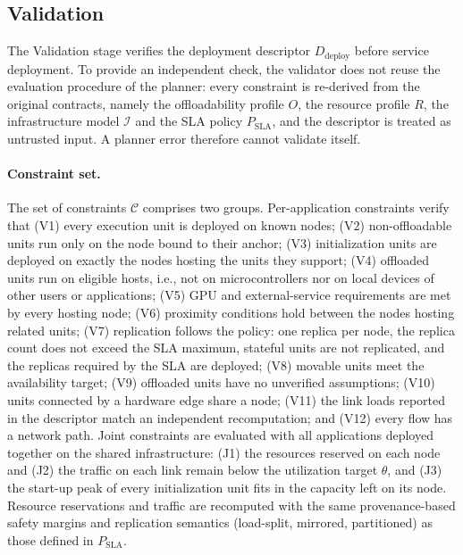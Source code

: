 \subsection{Validation}

The Validation stage verifies the deployment descriptor $D_{\mathrm{deploy}}$
before service deployment. To provide an independent check, the validator does
not reuse the evaluation procedure of the planner: every constraint is
re-derived from the original contracts, namely the offloadability profile $O$,
the resource profile $R$, the infrastructure model $\mathcal{I}$ and the SLA
policy $P_{\mathrm{SLA}}$, and the descriptor is treated as untrusted input.
A planner error therefore cannot validate itself.

\paragraph{Constraint set.}
The set of constraints $\mathcal{C}$ comprises two groups. Per-application
constraints verify that
(V1) every execution unit is deployed on known nodes;
(V2) non-offloadable units run only on the node bound to their anchor;
(V3) initialization units are deployed on exactly the nodes hosting the units
they support;
(V4) offloaded units run on eligible hosts, i.e., not on microcontrollers nor
on local devices of other users or applications;
(V5) GPU and external-service requirements are met by every hosting node;
(V6) proximity conditions hold between the nodes hosting related units;
(V7) replication follows the policy: one replica per node, the replica count
does not exceed the SLA maximum, stateful units are not replicated, and the
replicas required by the SLA are deployed;
(V8) movable units meet the availability target;
(V9) offloaded units have no unverified assumptions;
(V10) units connected by a hardware edge share a node;
(V11) the link loads reported in the descriptor match an independent
recomputation; and
(V12) every flow has a network path.
Joint constraints are evaluated with all applications deployed together on the
shared infrastructure: (J1) the resources reserved on each node and (J2) the
traffic on each link remain below the utilization target $\theta$, and (J3) the
start-up peak of every initialization unit fits in the capacity left on its
node. Resource reservations and traffic are recomputed with the same
provenance-based safety margins and replication semantics (load-split,
mirrored, partitioned) as those defined in $P_{\mathrm{SLA}}$.

